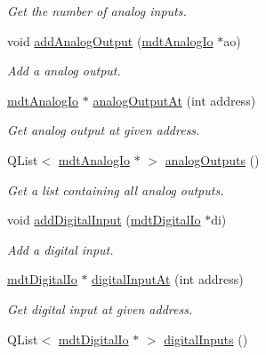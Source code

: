 \begin{DoxyCompactItemize}
\begin{DoxyCompactList}\small\item\em Get the number of analog inputs. \end{DoxyCompactList}\item 
void \hyperlink{classmdt_device_ios_aeed1140ed869866a6edc738d3b2a6d0b}{addAnalogOutput} (\hyperlink{classmdt_analog_io}{mdtAnalogIo} $\ast$ao)
\begin{DoxyCompactList}\small\item\em Add a analog output. \end{DoxyCompactList}\item 
\hyperlink{classmdt_analog_io}{mdtAnalogIo} $\ast$ \hyperlink{classmdt_device_ios_a70eba4430604bc30841ddb72664a0e98}{analogOutputAt} (int address)
\begin{DoxyCompactList}\small\item\em Get analog output at given address. \end{DoxyCompactList}\item 
\hypertarget{classmdt_device_ios_aa53fc12adeac76a039f005e72776362c}{
QList$<$ \hyperlink{classmdt_analog_io}{mdtAnalogIo} $\ast$ $>$ \hyperlink{classmdt_device_ios_aa53fc12adeac76a039f005e72776362c}{analogOutputs} ()}
\label{classmdt_device_ios_aa53fc12adeac76a039f005e72776362c}

\begin{DoxyCompactList}\small\item\em Get a list containing all analog outputs. \end{DoxyCompactList}\item 
void \hyperlink{classmdt_device_ios_a023571f5d77bd0874c08b53890a56381}{addDigitalInput} (\hyperlink{classmdt_digital_io}{mdtDigitalIo} $\ast$di)
\begin{DoxyCompactList}\small\item\em Add a digital input. \end{DoxyCompactList}\item 
\hyperlink{classmdt_digital_io}{mdtDigitalIo} $\ast$ \hyperlink{classmdt_device_ios_a78f68d0efeac0a23628f133121f28df8}{digitalInputAt} (int address)
\begin{DoxyCompactList}\small\item\em Get digital input at given address. \end{DoxyCompactList}\item 
\hypertarget{classmdt_device_ios_ab70374d3ad06739f91388526d4203def}{
QList$<$ \hyperlink{classmdt_digital_io}{mdtDigitalIo} $\ast$ $>$ \hyperlink{classmdt_device_ios_ab70374d3ad06739f91388526d4203def}{digitalInputs} ()}
\label{classmdt_device_ios_ab70374d3ad06739f91388526d4203def}


\end{DoxyCompactItemize}
